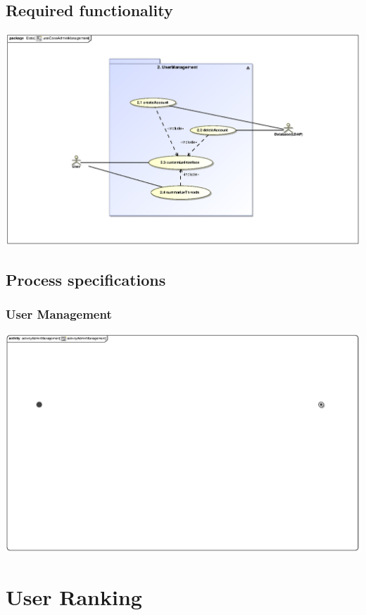 \documentclass[hidelinks, 12pt, oneside]{article}
\begin{document}
\subsection{Required functionality} 
\includegraphics[scale=.9]{Shaun/graphics/useCaseAdminManagement.eps}\\

\subsection{Process specifications}
\subsubsection{User Management}
\includegraphics[scale=.9]{Shaun/graphics/activityAdminManagement.eps}\\

\section{User Ranking}
\end{document}
